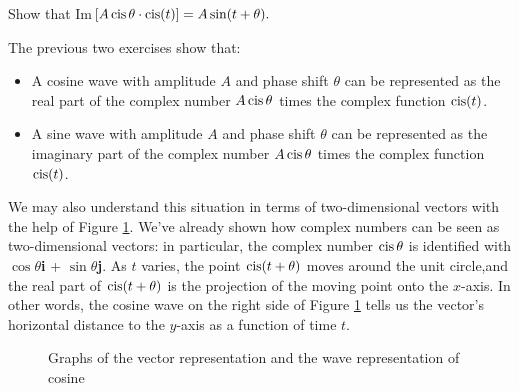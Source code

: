 \begin{exercise}{44}
Show that Im$ [A \operatorname{cis}\theta \cdot \operatorname{cis} (t)] = A \sin (t + \theta). $
\end{exercise}

\noindent
The previous two exercises show that: 

\begin{itemize}
\item
A cosine wave with amplitude $A$ and phase shift $\theta$ can be represented  as the real part of  the complex number $A \operatorname{cis}\theta$ times the complex function $\operatorname{cis}(t)$.
\item
A sine wave with amplitude $A$ and phase shift $\theta$ can be represented  as the imaginary part of  the complex number $A \operatorname{cis}\theta$ times the complex function $\operatorname{cis}(t)$.
\end{itemize}

\noindent
We may also understand this situation in terms of two-dimensional vectors with the help of Figure \ref{fig:complex:3}. We've already shown how complex numbers can be seen as two-dimensional vectors: in particular, the complex number $\operatorname{cis}\theta$ is identified with $\cos\theta$\textbf{i} + $\sin\theta$\textbf{j}. As $t$ varies, the point $\operatorname{cis}(t+\theta)$ moves around the unit circle,and the real part of $\operatorname{cis}(t + \theta)$ is the projection of the moving point onto the $x$-axis.  In other words, the cosine wave on the right side of Figure \ref{fig:complex:3} tells us the vector's horizontal distance to the $y$-axis as a function of time $t$.

\begin{figure}[htb]
	  \caption{\label{fig:complex:3} Graphs of the vector representation and the wave representation of cosine }
\end{figure}

